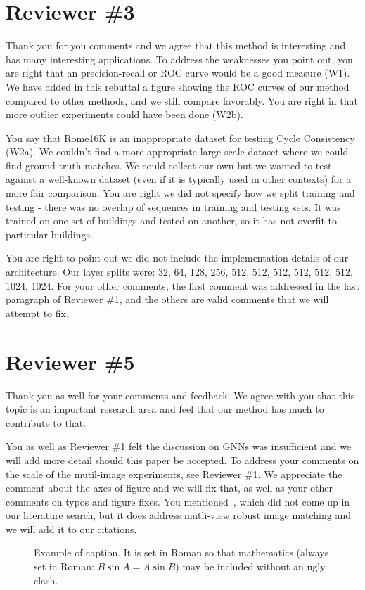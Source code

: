 \documentclass[10pt,twocolumn,letterpaper]{article}
\begin{document}
\section{Reviewer \#3}
Thank you for you comments and we agree that this method is interesting
and has many interesting applications.
To address the weaknesses you point out, you are right that an
precision-recall or ROC curve would be a good measure (W1). We have
added in this rebuttal a figure showing the ROC curves of our method
compared to other methods, and we still compare favorably. You are
right in that more outlier experiments could have been done (W2b). 

You say that Rome16K is an inappropriate dataset for testing Cycle
Consistency (W2a). We couldn't find a more appropriate large scale
dataset where we could find ground truth matches. We could collect our
own but we wanted to test against a well-known dataset (even if it is
typically used in other contexts) for a more fair comparison. You are 
right we did not specify how we split training and testing - there was
no overlap of sequences in training and testing sets. It was trained on
one set of buildings and tested on another, so it has not overfit to
particular buildings.

You are right to point out we did not include the implementation
details of our architecture. Our layer splits were: 
32, 64, 128, 256, 512, 512, 512, 512, 512, 512, 1024, 1024.
For your other comments, the first comment was addressed in the last
paragraph of Reviewer \#1, and the others are valid comments that we
will attempt to fix.

\section{Reviewer \#5}
Thank you as well for your comments and feedback.
We agree with you that this topic is an important research area and feel
that our method has much to contribute to that.

You as well as Reviewer \#1 felt the discussion on GNNs was insufficient
and we will add more detail should this paper be accepted. To address
your comments on the scale of the mutil-image experiments, see Reviewer
\#1. We appreciate the comment about the axes of figure and we will
fix that, as well as your other comments on typos and figure fixes.
You mentioned~\cite{hajder2006weak}, which did not come up in our
literature search, but it does address mutli-view robust image matching
and we will add it to our citations. 



\begin{figure}[t]
\begin{center}
\fbox{\rule{0pt}{1.8in} \rule{0.9\linewidth}{0pt}}
\end{center}
   \caption{Example of caption.  It is set in Roman so that mathematics
   (always set in Roman: $B \sin A = A \sin B$) may be included without an
   ugly clash.}
\label{fig:long}
\label{fig:onecol}
\end{figure}

{\small


}
\end{document}
